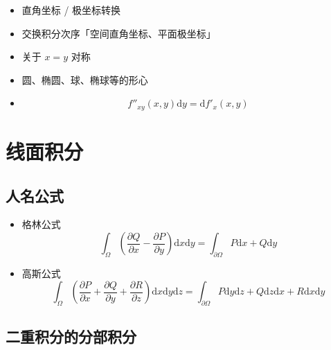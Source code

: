 \documentclass{ctexart}
\begin{document}
\begin{itemize}
    \item 直角坐标 / 极坐标转换
    \item 交换积分次序「空间直角坐标、平面极坐标」
    \item 关于 $x = y$ 对称
    \item 圆、椭圆、球、椭球等的形心
    \item \begin{equation}
              f''_{xy}(x, y) \mathrm{d} y = \mathrm{d} f'_x(x, y)
          \end{equation}
\end{itemize}

\section{线面积分}

\subsection{人名公式}

\begin{itemize}
    \item 格林公式 \begin{equation}
              \int_\Omega \left(\frac{\partial Q}{\partial x} - \frac{\partial P}{\partial y}\right) \mathrm{d}x \mathrm{d}y = \int_{\partial \Omega} P \mathrm{d}x + Q \mathrm{d}y
          \end{equation}
    \item 高斯公式 \begin{equation}
              \int_\Omega \left(\frac{\partial P}{\partial x} + \frac{\partial Q}{\partial y} + \frac{\partial R}{\partial z}\right) \mathrm{d}x \mathrm{d}y \mathrm{d}z = \int_{\partial \Omega} P \mathrm{d}y \mathrm{d}z + Q \mathrm{d}z \mathrm{d}x + R \mathrm{d}x \mathrm{d}y
          \end{equation}
\end{itemize}

\subsection{二重积分的分部积分}
\end{document}
